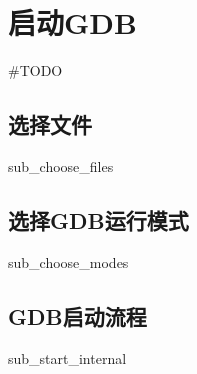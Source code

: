 \section{启动GDB}

\#TODO

\subsection{选择文件}
{sub_choose_files}

\subsection{选择GDB运行模式}
{sub_choose_modes}

\subsection{GDB启动流程}
{sub_start_internal}
